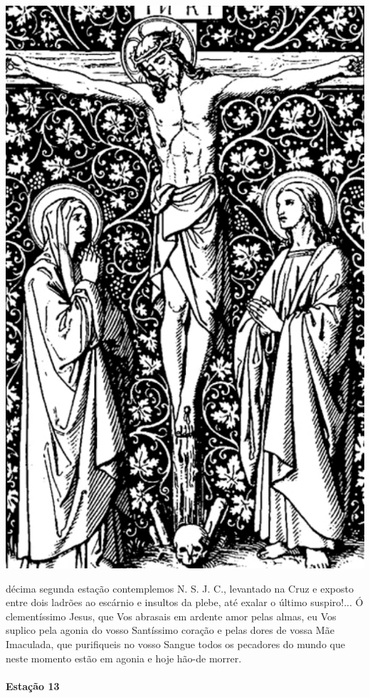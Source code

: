 \begin{nscenter}
\includegraphics[width=.8\textwidth, height=.8\textheight, keepaspectratio]{media/station12}
\end{nscenter}

 décima segunda estação contemplemos N. S. J. C., levantado na Cruz e exposto entre dois ladrões ao escárnio e insultos da plebe, até exalar o último suspiro!...
Ó clementíssimo Jesus, que Vos abrasais em ardente amor pelas almas, eu Vos suplico pela agonia do vosso Santíssimo coração e pelas dores de vossa Mãe Imaculada, que purifiqueis no vosso Sangue todos os pecadores do mundo que neste momento estão em agonia e hoje hão-de morrer.

\newpage

\paragraph{Estação 13}

